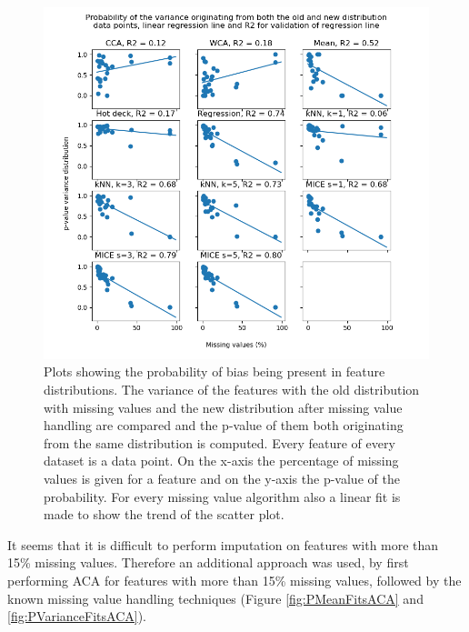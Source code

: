 \documentclass[10pt,a4paper]{report}
\begin{document}
	\begin{figure}[]
		\centering
		\includegraphics[width=\textwidth]{Var_Dist.PNG}
		\caption{Plots showing the probability of bias being present in feature distributions. The variance of the features with the old distribution with missing values and the new distribution after missing value handling are compared and the p-value of them both originating from the same distribution is computed. Every feature of every dataset is a data point. On the x-axis the percentage of missing values is given for a feature and on the y-axis the p-value of the probability. For every missing value algorithm also a linear fit is made to show the trend of the scatter plot.}
		\label{fig:PVarianceFits}
	\end{figure}
	
	It seems that it is difficult to perform imputation on features with more than 15\% missing values. Therefore an additional approach was used, by first performing ACA for features with more than 15\% missing values, followed by the known missing value handling techniques (Figure \ref{fig:PMeanFitsACA} and \ref{fig:PVarianceFitsACA}). 
	
\end{document}
